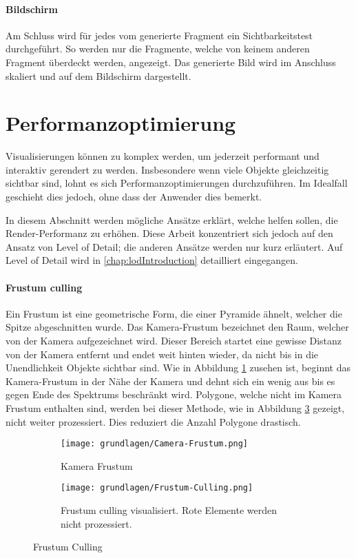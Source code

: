 \paragraph{Bildschirm}
Am Schluss wird für jedes vom  generierte Fragment ein Sichtbarkeitstest durchgeführt. So werden nur die Fragmente, welche von keinem anderen Fragment überdeckt werden, angezeigt. Das generierte Bild wird im Anschluss skaliert und auf dem Bildschirm dargestellt.


\section{Performanzoptimierung}
Visualisierungen können zu komplex werden, um jederzeit performant und interaktiv gerendert zu werden.
Insbesondere wenn viele Objekte gleichzeitig sichtbar sind, lohnt es sich Performanzoptimierungen durchzuführen.
Im Idealfall geschieht dies jedoch, ohne dass der Anwender dies bemerkt.

In diesem Abschnitt werden mögliche Ansätze erklärt, welche helfen sollen, die Render-Performanz zu erhöhen. Diese Arbeit konzentriert sich jedoch auf den Ansatz von Level of Detail; die anderen Ansätze werden nur kurz erläutert. Auf Level of Detail wird in \autoref{chap:lodIntroduction} detailliert eingegangen.

\paragraph{Frustum culling}
Ein Frustum ist eine geometrische Form, die einer Pyramide ähnelt, welcher die Spitze abgeschnitten wurde.
Das Kamera-Frustum bezeichnet den Raum, welcher von der Kamera aufgezeichnet wird. Dieser Bereich startet eine gewisse Distanz von der Kamera entfernt und endet weit hinten wieder, da nicht bis in die Unendlichkeit Objekte sichtbar sind.
Wie in Abbildung \ref{fig:CameraFrustum} zusehen ist, beginnt das Kamera-Frustum in der Nähe der Kamera und dehnt sich ein wenig aus bis es gegen Ende des Spektrums beschränkt wird.
Polygone, welche nicht im Kamera Frustum enthalten sind, werden bei dieser Methode, wie in Abbildung \ref{fig:FrustumCulling} gezeigt, nicht weiter prozessiert.
Dies reduziert die Anzahl Polygone drastisch.

\begin{figure}[H]
  \centering
  \begin{subfigure}{.5\textwidth}
    \centering
    \texttt{[image: grundlagen/Camera-Frustum.png]}
    \caption{Kamera Frustum}
    \label{fig:CameraFrustum}
  \end{subfigure}%
  \begin{subfigure}{.5\textwidth}
    \centering
    \texttt{[image: grundlagen/Frustum-Culling.png]}
    \caption{Frustum culling visualisiert. Rote Elemente werden nicht prozessiert.}
    \label{fig:FrustumCulling}
  \end{subfigure}
  \caption{Frustum Culling}
\end{figure}

